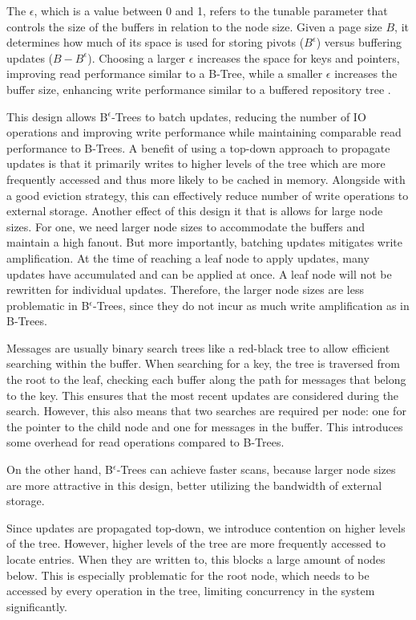 The $\epsilon$, which is a value between 0 and 1, refers to the tunable parameter that controls the size of the buffers in relation to the node size.
Given a page size $B$, it determines how much of its space is used for storing pivots ($B^\epsilon$) versus buffering updates ($B - B^\epsilon$).
Choosing a larger $\epsilon$ increases the space for keys and pointers, improving read performance similar to a B-Tree, while a smaller $\epsilon$ increases the buffer size, enhancing write performance similar to a buffered repository tree \cite{buchsbaum2000external}.

This design allows B$^\epsilon$-Trees to batch updates, reducing the number of \ac{IO} operations and improving write performance while maintaining comparable read performance to B-Trees.
A benefit of using a top-down approach to propagate updates is that it primarily writes to higher levels of the tree which are more frequently accessed and thus more likely to be cached in memory.
Alongside with a good eviction strategy, this can effectively reduce number of write operations to external storage.
Another effect of this design it that is allows for large node sizes.
For one, we need larger node sizes to accommodate the buffers and maintain a high fanout.
But more importantly, batching updates mitigates write amplification.
At the time of reaching a leaf node to apply updates, many updates have accumulated and can be applied at once. 
A leaf node will not be rewritten for individual updates. 
Therefore, the larger node sizes are less problematic in B$^\epsilon$-Trees, since they do not incur as much write amplification as in B-Trees.

Messages are usually binary search trees like a red-black tree to allow efficient searching within the buffer.
When searching for a key, the tree is traversed from the root to the leaf, checking each buffer along the path for messages that belong to the key.
This ensures that the most recent updates are considered during the search.
However, this also means that two searches are required per node: one for the pointer to the child node and one for messages in the buffer.
This introduces some overhead for read operations compared to B-Trees.

On the other hand, B$^\epsilon$-Trees can achieve faster scans, because larger node sizes are more attractive in this design, better utilizing the bandwidth of external storage.

Since updates are propagated top-down, we introduce contention on higher levels of the tree.
However, higher levels of the tree are more frequently accessed to locate entries.
When they are written to, this blocks a large amount of nodes below.
This is especially problematic for the root node, which needs to be accessed by every operation in the tree, limiting concurrency in the system significantly.


